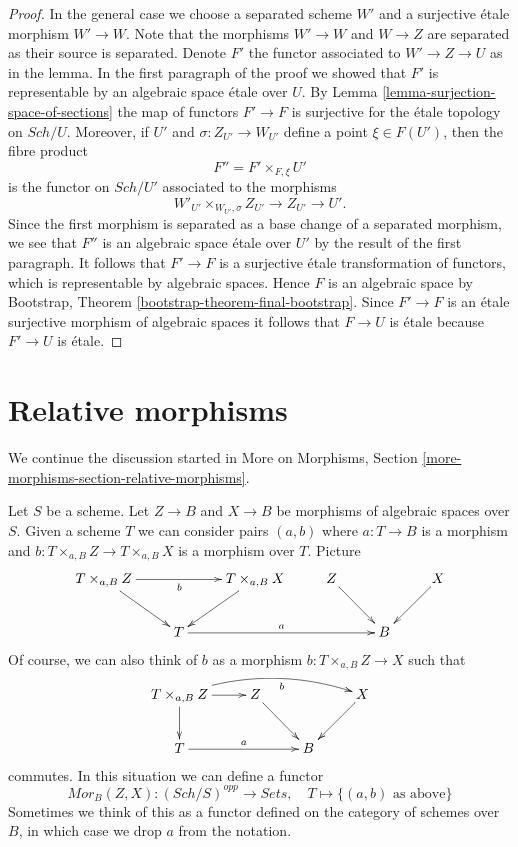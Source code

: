 \documentclass{stacks-project}
\theoremstyle{plain}
\theoremstyle{definition}
\theoremstyle{remark}
\numberwithin{equation}{subsection}
\def\Sch{\mathit{Sch}}
\begin{document}
\begin{proof}
\medskip\noindent
In the general case we choose a separated scheme $W'$ and a surjective
\'etale morphism $W' \to W$. Note that the morphisms $W' \to W$ and
$W \to Z$ are separated as their source is separated. Denote $F'$ the
functor associated to $W' \to Z \to U$ as in the lemma. In the first
paragraph of the proof we showed that $F'$ is representable by an
algebraic space \'etale over $U$. By
Lemma \ref{lemma-surjection-space-of-sections}
the map of functors $F' \to F$ is surjective for the \'etale topology
on $\Sch/U$. Moreover, if $U'$ and $\sigma : Z_{U'} \to W_{U'}$
define a point $\xi \in F(U')$, then the fibre product
$$
F'' = F' \times_{F, \xi} U'
$$
is the functor on $\Sch/U'$ associated to the morphisms
$$
W'_{U'} \times_{W_{U'}, \sigma} Z_{U'} \to Z_{U'} \to U'.
$$
Since the first morphism is separated as a base change of a separated
morphism, we see that $F''$ is an algebraic space \'etale over $U'$
by the result of the first paragraph. It follows that $F' \to F$ is a
surjective \'etale transformation of functors, which is representable
by algebraic spaces. Hence $F$ is an algebraic space by
Bootstrap, Theorem \ref{bootstrap-theorem-final-bootstrap}.
Since $F' \to F$ is an \'etale surjective morphism of algebraic spaces
it follows that $F \to U$ is \'etale because $F' \to U$ is \'etale.
\end{proof}









\section{Relative morphisms}
\label{section-relative-morphisms}

\noindent
We continue the discussion started in
More on Morphisms, Section \ref{more-morphisms-section-relative-morphisms}.

\medskip\noindent
Let $S$ be a scheme. Let $Z \to B$ and $X \to B$ be morphisms of
algebraic spaces over $S$. Given a scheme $T$ we can consider pairs
$(a, b)$ where $a : T \to B$
is a morphism and $b : T \times_{a, B} Z \to T \times_{a, B} X$
is a morphism over $T$. Picture
\begin{equation}
\label{equation-hom}
\vcenter{
\xymatrix{
T \times_{a, B} Z \ar[rd] \ar[rr]_b & &
T \times_{a, B} X \ar[ld] & Z \ar[rd] & & X \ar[ld] \\
& T \ar[rrr]^a & & & B
}
}
\end{equation}
Of course, we can also think of $b$ as a morphism
$b : T \times_{a, B} Z \to X$ such that
$$
\xymatrix{
T \times_{a, B} Z \ar[r] \ar[d] \ar@/^1pc/[rrr]_-b &
Z \ar[rd] & & X \ar[ld] \\
T \ar[rr]^a & & B
}
$$
commutes. In this situation we can define a functor
\begin{equation}
\label{equation-hom-functor}
\mathit{Mor}_B(Z, X) : (\Sch/S)^{opp} \longrightarrow \textit{Sets},
\quad
T \longmapsto \{(a, b)\text{ as above}\}
\end{equation}
Sometimes we think of this as a functor defined on the category
of schemes over $B$, in which case we drop $a$ from the notation.
\end{document}
